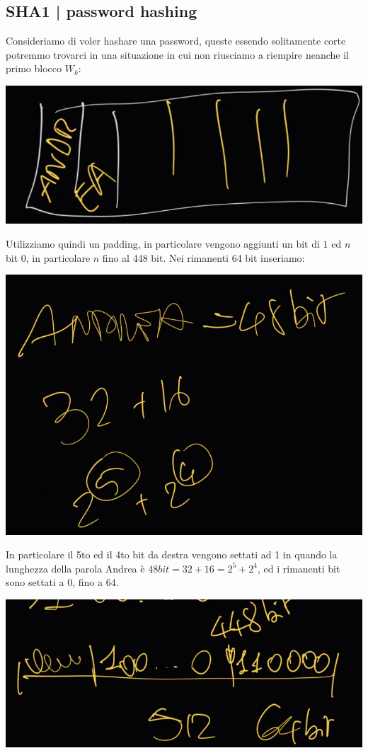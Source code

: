 \documentclass[11pt, oneside]{article}   	%
\begin{document}
\subsection*{SHA1 | password hashing}
Consideriamo di voler hashare una password, queste essendo solitamente corte potremmo trovarci in una situazione in cui non riusciamo a riempire neanche il primo blocco $W_k$:
\begin{center}
\includegraphics[scale= 0.5]{blocks5}
\end{center}
Utilizziamo quindi un padding, in particolare vengono aggiunti un bit di $1$ ed $n$ bit $0$, in particolare $n$ fino al 448 bit. Nei rimanenti 64 bit inseriamo:
\begin{center}
\includegraphics[scale= 0.5]{blocks6}
\end{center}
In particolare il 5to ed il 4to bit da destra vengono settati ad 1 in quando la lunghezza della parola Andrea è $48 bit = 32 + 16 = 2^5 + 2^4$, ed i rimanenti bit sono settati a 0, fino a 64.
\begin{center}
\includegraphics[scale= 0.5]{blocks7}
\end{center}
\end{document}
